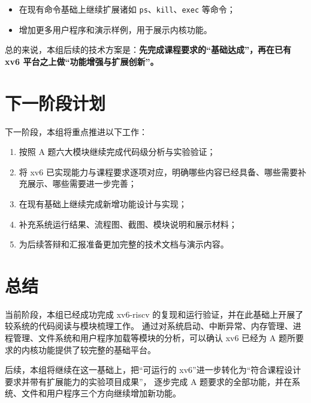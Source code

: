 \documentclass[12pt,a4paper]{ctexart}
\begin{document}
\begin{itemize}
  \item 在现有命令基础上继续扩展诸如 \texttt{ps}、\texttt{kill}、\texttt{exec} 等命令；
  \item 增加更多用户程序和演示样例，用于展示内核功能。
\end{itemize}

总的来说，本组后续的技术方案是：\textbf{先完成课程要求的“基础达成”，再在已有 xv6 平台之上做“功能增强与扩展创新”。}

\section{下一阶段计划}

下一阶段，本组将重点推进以下工作：

\begin{enumerate}
  \item 按照 A 题六大模块继续完成代码级分析与实验验证；
  \item 将 xv6 已实现能力与课程要求逐项对应，明确哪些内容已经具备、哪些需要补充展示、哪些需要进一步完善；
  \item 在现有基础上继续完成新增功能设计与实现；
  \item 补充系统运行结果、流程图、截图、模块说明和展示材料；
  \item 为后续答辩和汇报准备更加完整的技术文档与演示内容。
\end{enumerate}

\section{总结}

当前阶段，本组已经成功完成 xv6-riscv 的复现和运行验证，并在此基础上开展了较系统的代码阅读与模块梳理工作。
通过对系统启动、中断异常、内存管理、进程管理、文件系统和用户程序加载等模块的分析，可以确认 xv6 已经为 A 题所要求的内核功能提供了较完整的基础平台。

后续，本组将继续在这一基础上，把“可运行的 xv6”进一步转化为“符合课程设计要求并带有扩展能力的实验项目成果”，
逐步完成 A 题要求的全部功能，并在系统、文件和用户程序三个方向继续增加新功能。
\end{document}

